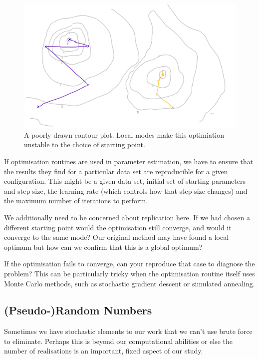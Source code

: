 \documentclass[
  letterpaper,
  DIV=11,
  numbers=noendperiod]{scrreprt}
\begin{document}
\begin{figure}[H]

{\centering \includegraphics{images/401-production-reproducibility/contour-optimisation.png}

}

\caption{A poorly drawn contour plot. Local modes make this optimiation
unstable to the choice of starting point.}

\end{figure}%

If optimisation routines are used in parameter estimation, we have to
ensure that the results they find for a particular data set are
reproducible for a given configuration. This might be a given data set,
initial set of starting parameters and step size, the learning rate
(which controls how that step size changes) and the maximum number of
iterations to perform.

We additionally need to be concerned about replication here. If we had
chosen a different starting point would the optimisation still converge,
and would it converge to the same mode? Our original method may have
found a local optimum but how can we confirm that this is a global
optimum?

If the optimisation fails to converge, can your reproduce that case to
diagnose the problem? This can be particularly tricky when the
optimisation routine itself uses Monte Carlo methods, such as stochastic
gradient descent or simulated annealing.

\subsection{(Pseudo-)Random Numbers}\label{pseudo-random-numbers}

Sometimes we have stochastic elements to our work that we can't use
brute force to eliminate. Perhaps this is beyond our computational
abilities or else the number of realisations is an important, fixed
aspect of our study.
\end{document}
